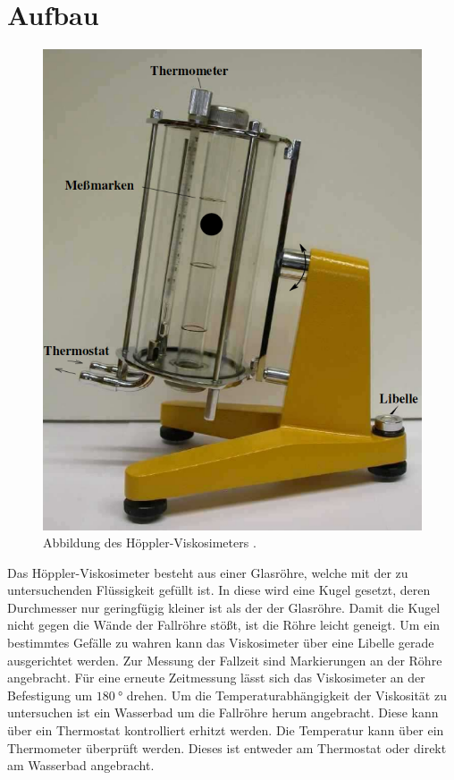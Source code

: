 \section{Aufbau}
\label{sec:Aufbau}
\begin{figure}
	\centering
	\includegraphics[width=\linewidth-100pt,height=\textheight-100pt,keepaspectratio]{content/Bilder/Hoeppler.png}
	\caption{Abbildung des Höppler-Viskosimeters \cite{V207}.}
	\label{fig:Aufbau2}
\end{figure}
Das Höppler-Viskosimeter besteht aus einer Glasröhre, welche mit der zu
untersuchenden Flüssigkeit gefüllt ist. In diese wird eine Kugel gesetzt, deren
Durchmesser nur geringfügig kleiner ist als der der Glasröhre. Damit die Kugel
nicht gegen die Wände der Fallröhre stößt, ist die Röhre leicht geneigt. Um ein bestimmtes Gefälle zu wahren
 kann das Viskosimeter über eine Libelle gerade ausgerichtet werden. Zur Messung
der Fallzeit sind Markierungen an der Röhre angebracht. Für eine erneute Zeitmessung
lässt sich das Viskosimeter an der Befestigung um $\SI{180}{\degree}$ drehen. Um die Temperaturabhängigkeit
der Viskosität zu untersuchen ist ein Wasserbad um die Fallröhre herum angebracht.
Diese kann über ein Thermostat kontrolliert erhitzt werden. Die Temperatur
kann über ein Thermometer überprüft werden. Dieses ist entweder am Thermostat oder 
direkt am Wasserbad angebracht.
